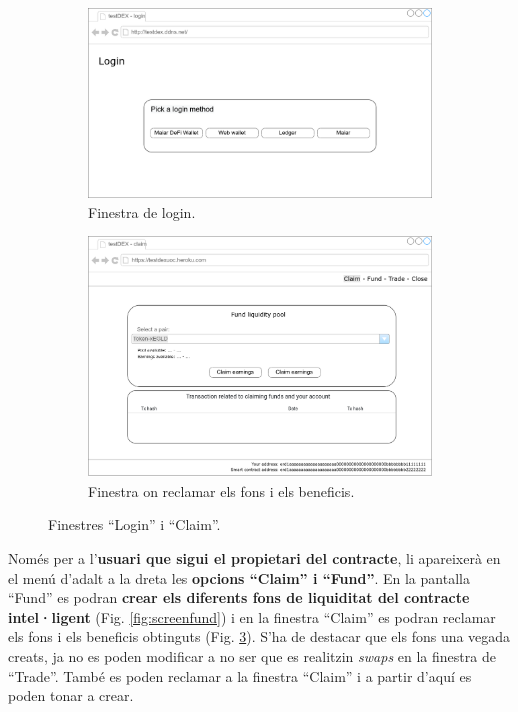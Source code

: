\documentclass[11pt,a4paper]{article}
\begin{document}
\begin{figure}[!htb]
\begin{subfigure}[b]{0.39\textwidth}
  \includegraphics[width=\linewidth]{screen_login.png}
  \caption{Finestra de login.}\label{fig:screenlogin}
\end{subfigure}\hfill
\begin{subfigure}[b]{0.59\textwidth}
  \includegraphics[width=\linewidth]{screen_claim.png}
  \caption{Finestra on reclamar els fons i els beneficis.}\label{fig:screenclaim}
\end{subfigure}\hfill
\caption{Finestres ``Login'' i ``Claim''.}
\end{figure}

Només per a l'\textbf{usuari que sigui el propietari del contracte}, li apareixerà en el menú d'adalt a la dreta les \textbf{opcions ``Claim'' i ``Fund''}. En la pantalla ``Fund'' es podran \textbf{crear els diferents fons de liquiditat del contracte intel·ligent} (Fig. \ref{fig:screenfund}) i en la finestra ``Claim'' es podran reclamar els fons i els beneficis obtinguts (Fig. \ref{fig:screenclaim}). S'ha de destacar que els fons una vegada creats, ja no es poden modificar a no ser que es realitzin \textit{swaps} en la finestra de ``Trade''. També es poden reclamar a la finestra ``Claim'' i a partir d'aquí es poden tonar a crear.
\end{document}

